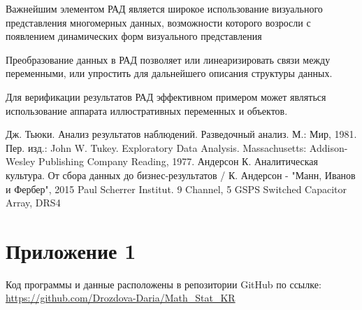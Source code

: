 \documentclass[a4paper, 12pt]{article}
\begin{document}
Важнейшим элементом РАД является широкое использование визуального представления многомерных данных, возможности которого возросли с появлением динамических форм визуального представления

Преобразование данных в РАД позволяет или линеаризировать связи между переменными, или упростить для дальнейшего описания структуры данных.

Для верификации результатов РАД эффективном примером может являться использование аппарата иллюстративных переменных и объектов.

\newpage
{}
\begin{thebibliography}{}
     Дж. Тьюки. Анализ результатов наблюдений. Разведочный анализ. М.: Мир, 1981. Пер. изд.: John W. Tukey. Exploratory Data Analysis. Massachusetts: Addison-Wesley Publishing Company Reading, 1977.
     Андерсон К. Аналитическая культура. От сбора данных до бизнес-результатов / К. Андерсон - "Манн, Иванов и Фербер", 2015
     Paul Scherrer Institut. 9 Channel, 5 GSPS Switched Capacitor Array, DRS4 
    
\end{thebibliography}

\newpage
\section*{Приложение 1} \label{pr}

Код программы и данные расположены в репозитории GitHub по ссылке: \url{https://github.com/Drozdova-Daria/Math_Stat_KR}
\end{document}
